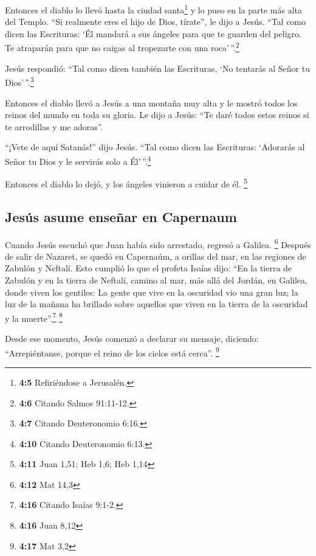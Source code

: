  Entonces el diablo lo llevó hasta la ciudad
santa\footnote{\textbf{4:5} Refiriéndose a Jerusalén.} y lo puso en la
parte más alta del Templo.  ``Si realmente eres el hijo de
Dios, tírate'', le dijo a Jesús. ``Tal como dicen las Escrituras: `Él
mandará a sus ángeles para que te guarden del peligro. Te atraparán para
que no caigas al tropezarte con una roca'\,''.\footnote{\textbf{4:6}
  Citando Salmos 91:11-12.}

 Jesús respondió: ``Tal como dicen también las Escrituras,
`No tentarás al Señor tu Dios'\,''.\footnote{\textbf{4:7} Citando
  Deuteronomio 6:16.}

 Entonces el diablo llevó a Jesús a una montaña muy alta y
le mostró todos los reinos del mundo en toda su gloria. 
Le dijo a Jesús: ``Te daré todos estos reinos si te arrodillas y me
adoras''.

 ``¡Vete de aquí Satanás!'' dijo Jesús. ``Tal como dicen
las Escrituras: `Adorarás al Señor tu Dios y le servirás solo a
Él'\,''.\footnote{\textbf{4:10} Citando Deuteronomio 6:13.}

 Entonces el diablo lo dejó, y los ángeles vinieron a
cuidar de él. \footnote{\textbf{4:11} Juan 1,51; Heb 1,6; Heb 1,14}

\hypertarget{jesuxfas-asume-enseuxf1ar-en-capernaum}{%
\subsection{Jesús asume enseñar en
Capernaum}\label{jesuxfas-asume-enseuxf1ar-en-capernaum}}

 Cuando Jesús escuchó que Juan había sido arrestado,
regresó a Galilea. \footnote{\textbf{4:12} Mat 14,3} 
Después de salir de Nazaret, se quedó en Capernaúm, a orillas del mar,
en las regiones de Zabulón y Neftalí.  Esto cumplió lo
que el profeta Isaías dijo:  ``En la tierra de Zabulón y
en la tierra de Neftalí, camino al mar, más allá del Jordán, en Galilea,
donde viven los gentiles:  La gente que vive en la
oscuridad vio una gran luz; la luz de la mañana ha brillado sobre
aquellos que viven en la tierra de la oscuridad y la
muerte''.\footnote{\textbf{4:16} Citando Isaías 9:1-2.} \footnote{\textbf{4:16}
  Juan 8,12}

 Desde ese momento, Jesús comenzó a declarar su mensaje,
diciendo: ``Arrepiéntanse, porque el reino de los cielos está cerca''.
\footnote{\textbf{4:17} Mat 3,2}

